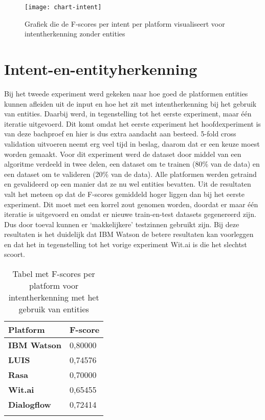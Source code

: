 \begin{figure}[H]
    \label{fig:chart-intent-no-entity}
    \centering
    \texttt{[image: chart-intent]}
    \caption{Grafiek die de F-scores per intent per platform visualiseert voor intentherkenning zonder entities}
\end{figure}

\section{Intent-en-entityherkenning}

Bij het tweede experiment werd gekeken naar hoe goed de platformen entities kunnen afleiden uit de input en hoe het zit met intentherkenning bij het gebruik van entities. Daarbij werd, in tegenstelling tot het eerste experiment, maar één iteratie uitgevoerd. Dit komt omdat het eerste experiment het hoofdexperiment is van deze bachproef en hier is dus extra aandacht aan besteed. 5-fold cross validation uitvoeren neemt erg veel tijd in beslag, daarom dat er een keuze moest worden gemaakt. Voor dit experiment werd de dataset door middel van een algoritme verdeeld in twee delen, een dataset om te trainen (80\% van de data) en een dataset om te valideren (20\% van de data). Alle platformen werden getraind en gevalideerd op een manier dat ze nu wel entities bevatten. Uit de resultaten valt het meteen op dat de F-scores gemiddeld hoger liggen dan bij het eerste experiment. Dit moet met een korrel zout genomen worden, doordat er maar één iteratie is uitgevoerd en omdat er nieuwe train-en-test datasets gegenereerd zijn. Dus door toeval kunnen er ‘makkelijkere’ testzinnen gebruikt zijn. Bij deze resultaten is het duidelijk dat IBM Watson de betere resultaten kan voorleggen en dat het in tegenstelling tot het vorige experiment Wit.ai is die het slechtst scoort.


\begin{center}
    \begin{longtable}{| l | l |}
        \hline
        \textbf{Platform} & \textbf{F-score} \\ \hline
        \textbf{IBM Watson} & 0,80000 \\ \hline  
        \textbf{LUIS} & 0,74576 \\ \hline  
        \textbf{Rasa} & 0,70000 \\ \hline  
        \textbf{Wit.ai} & 0,65455  \\ \hline  
        \textbf{Dialogflow} & 0,72414 \\ \hline  
        \caption{Tabel met F-scores per platform voor intentherkenning met het gebruik van entities}                                    
    \end{longtable}
    \label{tbl:results-intent-entity}
\end{center}

